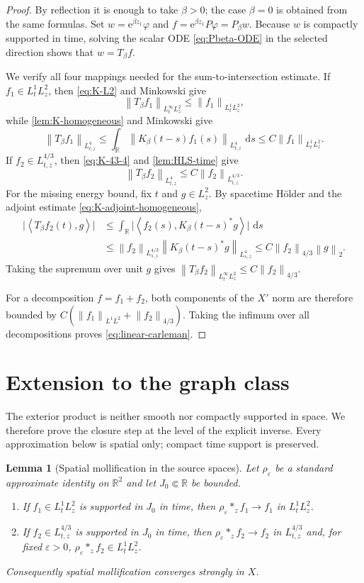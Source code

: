 \documentclass[11pt,oneside]{book}
\newtheorem{lemma}[theorem]{Lemma}
\theoremstyle{definition}
\theoremstyle{remark}
\newcommand{\R}{\mathbb R}
\newcommand{\1}{\mathbf 1}
\newcommand{\dd}{\,\mathrm d}
\newcommand{\norm}[1]{\left\lVert #1\right\rVert}
\newcommand{\pair}[2]{\left\langle #1,#2\right\rangle}
\newcommand{\e}{\mathrm e}
\newcommand{\eps}{\varepsilon}
\begin{document}
\begin{proof}
By reflection it is enough to take $\beta>0$; the case $\beta=0$ is obtained
from the same formulas.  Set
$w=\e^{\beta z_1}\varphi$ and
$f=\e^{\beta z_1}P\varphi=P_\beta w$.  Because $w$ is compactly supported in
time, solving the scalar ODE \eqref{eq:Pbeta-ODE} in the selected direction
shows that $w=T_\beta f$.

We verify all four mappings needed for the sum-to-intersection estimate.  If
$f_1\in L^1_tL^2_z$, then \eqref{eq:K-L2} and Minkowski give
\[
 \norm{T_\beta f_1}_{L^\infty_tL^2_z}
 \le\norm{f_1}_{L^1_tL^2_z},
\]
while \cref{lem:K-homogeneous} and Minkowski give
\[
 \norm{T_\beta f_1}_{L^4_{t,z}}
 \le\int_\R
   \norm{K_\beta(t-s)f_1(s)}_{L^4_{t,z}}\,\dd s
 \le C\norm{f_1}_{L^1_tL^2_z}.
\]
If $f_2\in L^{4/3}_{t,z}$, then \eqref{eq:K-43-4} and
\cref{lem:HLS-time} give
\[
 \norm{T_\beta f_2}_{L^4_{t,z}}
 \le C\norm{f_2}_{L^{4/3}_{t,z}}.
\]
For the missing energy bound, fix $t$ and $g\in L^2_z$.  By spacetime
H\"older and the adjoint estimate \eqref{eq:K-adjoint-homogeneous},
\begin{align*}
 \big|\pair{T_\beta f_2(t)}{g}\big|
 &\le\int_\R
   \big|\pair{f_2(s)}{K_\beta(t-s)^*g}\big|\,\dd s\\
 &\le\norm{f_2}_{L^{4/3}_{s,z}}
       \norm{K_\beta(t-s)^*g}_{L^4_{s,z}}
 \le C\norm{f_2}_{4/3}\norm g_2.
\end{align*}
Taking the supremum over unit $g$ gives
$\norm{T_\beta f_2}_{L^\infty_tL^2_z}\le C\norm{f_2}_{4/3}$.

For a decomposition $f=f_1+f_2$, both components of the $X'$ norm are
therefore bounded by
$C(\norm{f_1}_{L^1L^2}+\norm{f_2}_{4/3})$.  Taking the infimum over all
decompositions proves \eqref{eq:linear-carleman}.
\end{proof}

\section{Extension to the graph class}
The exterior product is neither smooth nor compactly supported in space.  We
therefore prove the closure step at the level of the explicit inverse.  Every
approximation below is spatial only; compact time support is preserved.

\begin{lemma}[Spatial mollification in the source spaces]
\label{lem:spatial-mollification-source}
Let $\rho_\eps$ be a standard approximate identity on $\R^2$ and let
$J_0\Subset\R$ be bounded.
\begin{enumerate}
\item If $f_1\in L^1_tL^2_z$ is supported in $J_0$ in time, then
$\rho_\eps*_zf_1\to f_1$ in $L^1_tL^2_z$.
\item If $f_2\in L^{4/3}_{t,z}$ is supported in $J_0$ in time, then
$\rho_\eps*_zf_2\to f_2$ in $L^{4/3}_{t,z}$ and, for fixed $\eps>0$,
$\rho_\eps*_zf_2\in L^1_tL^2_z$.
\end{enumerate}
Consequently spatial mollification converges strongly in $X$.
\end{lemma}
\end{document}
